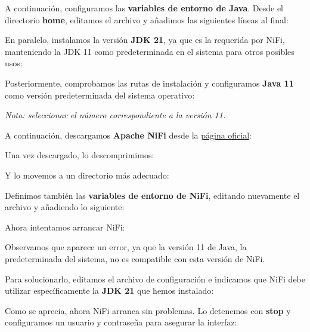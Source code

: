\documentclass{../../../miPlantilla}
\begin{document}
A continuación, configuramos las \textbf{variables de entorno de Java}. Desde el directorio \textbf{home}, editamos el archivo  y añadimos las siguientes líneas al final:


\newpage

En paralelo, instalamos la versión \textbf{JDK 21}, ya que es la requerida por NiFi, manteniendo la JDK 11 como predeterminada en el sistema para otros posibles usos:


Posteriormente, comprobamos las rutas de instalación y configuramos \textbf{Java 11} como versión predeterminada del sistema operativo:


\textit{Nota: seleccionar el número correspondiente a la versión 11.}


A continuación, descargamos \textbf{Apache NiFi} desde la \href{https://nifi.apache.org/}{página oficial}:


Una vez descargado, lo descomprimimos:


Y lo movemos a un directorio más adecuado:


Definimos también las \textbf{variables de entorno de NiFi}, editando nuevamente el archivo  y añadiendo lo siguiente:


Ahora intentamos arrancar NiFi:


Observamos que aparece un error, ya que la versión 11 de Java, la predeterminada del sistema, no es compatible con esta versión de NiFi.

\newpage

Para solucionarlo, editamos el archivo de configuración  e indicamos que NiFi debe utilizar específicamente la \textbf{JDK 21} que hemos instalado:


Como se aprecia, ahora NiFi arranca sin problemas. Lo detenemos con  \textbf{stop} y configuramos un usuario y contraseña para asegurar la interfaz:

\end{document}
